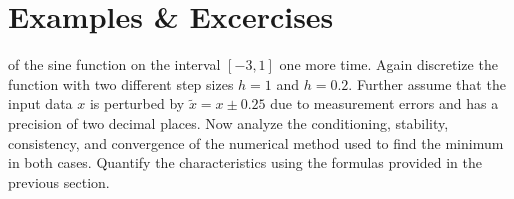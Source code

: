 

\newpage
\section{Examples \& Excercises}


 of the sine function on the interval $[-3, 1]$ one more time. 
Again discretize the function with two different step sizes $h=1$ and $h=0.2$. Further assume that the input 
data $x$ is perturbed by $\tilde{x} = x \pm 0.25$ due to measurement errors and has a precision of two decimal places.
Now analyze the conditioning, stability, consistency, and convergence of the numerical method used 
to find the minimum in both cases. Quantify the characteristics using the formulas provided in the previous section.

